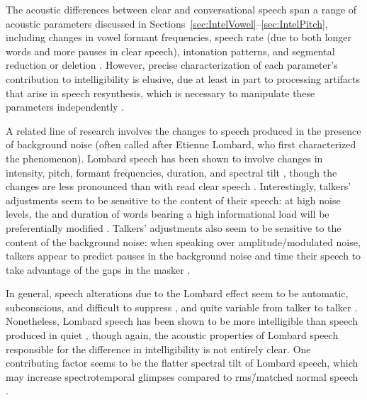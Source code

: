 The acoustic differences between clear and conversational speech span a range of acoustic parameters discussed in Sections~\ref{sec:IntelVowel}–\ref{sec:IntelPitch}, including changes in vowel formant frequencies, speech rate (due to both longer words and more pauses in clear speech), intonation patterns, and segmental reduction or deletion \citep[see][\intal]{PichenyEtAl1986, LiLoizou2008, SmiljanicBradlow2008, HazanBaker2011}.  However, precise characterization of each parameter’s contribution to intelligibility is elusive, due at least in part to processing artifacts that arise in speech resynthesis, which is necessary to manipulate these parameters independently \citep[cf. discussions in][]{PichenyEtAl1989, UchanskiEtAl1996, LiuZeng2006, KrauseBraida2009}.

A related line of research involves the changes to speech produced in the presence of background noise (often called  after Etienne Lombard, who first characterized the phenomenon).  Lombard speech has been shown to involve changes in intensity, pitch, formant frequencies, duration, and spectral tilt \citep{LaneTranel1971, SummersEtAl1988, LuCooke2008}, though the changes are less pronounced than with read clear speech \citep{HazanBaker2011}.  Interestingly, talkers’ adjustments seem to be sensitive to the content of their speech: at high noise levels, the \fo{} and duration of words bearing a high informational load will be preferentially modified \citep{PatelSchell2008}.  Talkers’ adjustments also seem to be sensitive to the content of the background noise: when speaking over amplitude\-/modulated noise, talkers appear to predict pauses in the background noise and time their speech to take advantage of the gaps in the masker \citep{CookeLu2010}.  

In general, speech alterations due to the Lombard effect seem to be automatic, subconscious, and difficult to suppress \citep{PickEtAl1989}, and quite variable from talker to talker \citep{Junqua1993}.  Nonetheless, Lombard speech has been shown to be more intelligible than speech produced in quiet \citep{DreherONeill1957, SummersEtAl1988}, though again, the acoustic properties of Lombard speech responsible for the difference in intelligibility is not entirely clear.  One contributing factor seems to be the flatter spectral tilt of Lombard speech, which may increase spectrotemporal glimpses compared to \ac{rms}\=/matched normal speech \citep{LuCooke2009}.


